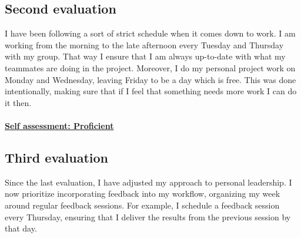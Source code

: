 \documentclass{article}
\begin{document}
\subsection{Second evaluation}
I have been following a sort of strict schedule when it comes down to work. I am working from the morning to the late afternoon every Tuesday and Thursday
with my group. That way I ensure that I am always up-to-date with what my teammates are doing in the project. Moreover, I do my personal project work on Monday and Wednesday, leaving 
Friday to be a day which is free. This was done intentionally, making sure that if I feel that something needs more work I can do it then. \\\\
\underline{\textbf{Self assessment: Proficient}}
\subsection{Third evaluation}
Since the last evaluation, I have adjusted my approach to personal leadership. I now prioritize incorporating feedback into my workflow, organizing my week around regular feedback sessions. For example, I schedule a feedback session every Thursday, ensuring that I deliver the results from the previous session by that day.
\end{document}
